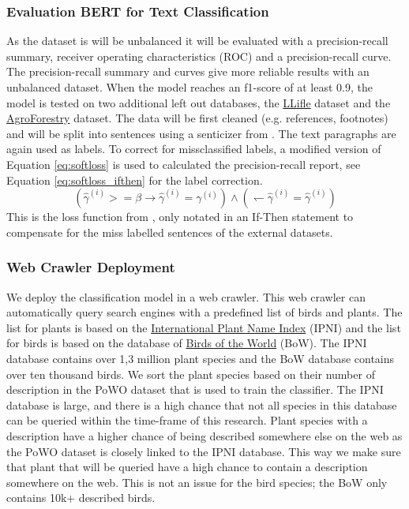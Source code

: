 \documentclass[a4paper, 12pt, oneside]{book} %
\begin{document}
\subsubsection{Evaluation BERT for Text Classification}
As the dataset is will be unbalanced it will be evaluated with a precision-recall summary, receiver operating characteristics (ROC) and a precision-recall curve.
The precision-recall summary and curves give more reliable results with an unbalanced dataset.
When the model reaches an f1-score of at least 0.9, the model is tested on two additional left out databases, the \href{http://www.llifle.com/}{LLifle} dataset and the \href{https://www.worldagroforestry.org/}{AgroForestry} dataset.
The data will be first cleaned (e.g. references, footnotes) and will be split into sentences using a senticizer from \textcite{honnibal_spacy_2020}.
The text paragraphs are again used as labels. 
To correct for missclassified labels, a modified version of Equation \ref{eq:softloss} is used to calculated the precision-recall report, see Equation \ref{eq:softloss_ifthen} for the label correction.
\begin{equation} \label{eq:softloss_ifthen}
(\hat{\gamma}^{(i)} >= \beta \rightarrow \hat{\gamma}^{(i)} = \gamma^{(i)}) \wedge ( \leftharpoondown \hat{\gamma}^{(i)} = \hat{\gamma}^{(i)})
\end{equation}
This is the loss function from \textcite{reed_training_2015}, only notated in an If-Then statement to compensate for the miss labelled sentences of the external datasets.

\subsubsection{Web Crawler Deployment}
We deploy the classification model in a web crawler.
This web crawler can automatically query search engines with a predefined list of birds and plants.
The list for plants is based on the \href{https://www.ipni.org/}{International Plant Name Index} (IPNI) and the list for birds is based on the database of \href{https://birdsoftheworld.org/bow/home}{Birds of the World} (BoW).
The IPNI database contains over 1,3 million plant species and the BoW database contains over ten thousand birds.
We sort the plant species based on their number of description in the PoWO dataset that is used to train the classifier.
The IPNI database is large, and there is a high chance that not all species in this database can be queried within the time-frame of this research.
Plant species with a description have a higher chance of being described somewhere else on the web as the PoWO dataset is closely linked to the IPNI database.
This way we make sure that plant that will be queried have a high chance to contain a description somewhere on the web.
This is not an issue for the bird species; the BoW only contains 10k+ described birds.
\end{document}
